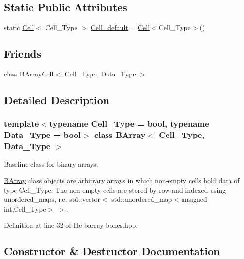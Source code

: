 \subsection*{Static Public Attributes}
\begin{DoxyCompactItemize}
\item 
static \hyperlink{class_cell}{Cell}$<$ Cell\+\_\+\+Type $>$ \hyperlink{class_b_array_a5700cd9bb3814f84c62dda0ea47931bc}{Cell\+\_\+default} = \hyperlink{class_cell}{Cell}$<$Cell\+\_\+\+Type$>$()
\end{DoxyCompactItemize}
\subsection*{Friends}
\begin{DoxyCompactItemize}
\item 
class \hyperlink{class_b_array_a2cd2ece8a4fc1027d3151b1ec33151cb}{B\+Array\+Cell$<$ Cell\+\_\+\+Type, Data\+\_\+\+Type $>$}
\end{DoxyCompactItemize}


\subsection{Detailed Description}
\subsubsection*{template$<$typename Cell\+\_\+\+Type = bool, typename Data\+\_\+\+Type = bool$>$\newline
class B\+Array$<$ Cell\+\_\+\+Type, Data\+\_\+\+Type $>$}

Baseline class for binary arrays. 

{\ttfamily \hyperlink{class_b_array}{B\+Array}} class objects are arbitrary arrays in which non-\/empty cells hold data of type {\ttfamily Cell\+\_\+\+Type}. The non-\/empty cells are stored by row and indexed using {\ttfamily unordered\+\_\+map}s, i.\+e. {\ttfamily std\+::vector$<$ std\+::unordered\+\_\+map$<$unsigned int,Cell\+\_\+\+Type$>$ $>$}. 

Definition at line 32 of file barray-\/bones.\+hpp.



\subsection{Constructor \& Destructor Documentation}
\mbox{\label{class_b_array_a1bbfcc43ad43f30fd448b63e9ab5861f}} 
